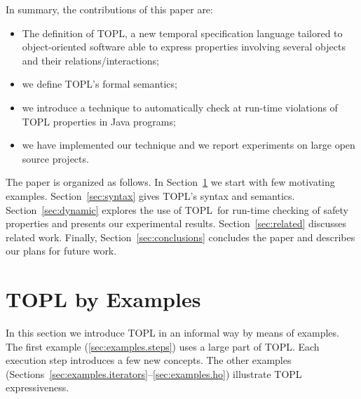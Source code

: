 \documentclass[10pt]{llncs} %
\newcommand{\TPL}{TOPL}
\begin{document}
In summary, the contributions of this paper are:
\begin{itemize}
\item The definition of TOPL, a new temporal specification language tailored to object-oriented software able to express properties involving several objects and their relations/interactions;
\item we define TOPL's formal semantics;
\item we introduce a technique to automatically check at run-time violations of TOPL properties in Java programs;
\item we have implemented our technique and we report experiments on large open source projects.
\end{itemize}

The paper is organized as follows. In Section~\ref{sec:examples} we start with few motivating examples.
Section~\ref{sec:syntax} gives  \TPL's syntax  and semantics.
Section~\ref{sec:dynamic} explores the use of \TPL \ for run-time checking of safety properties and presents our experimental results. Section~\ref{sec:related} discusses related work.
Finally, Section~\ref{sec:conclusions} concludes the paper and describes our plans for future work.




\section{TOPL by Examples} \label{sec:examples} %
In this section we introduce TOPL in an informal way by means of examples.
The first example (\autoref{sec:examples.steps}) uses a large part of \TPL\null.
Each execution step introduces a few new concepts.
The other examples (Sections~\ref*{sec:examples.iterators}--\ref*{sec:examples.ho}) illustrate TOPL expressiveness.
\end{document}
